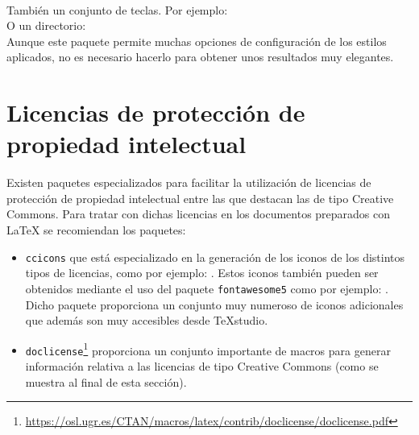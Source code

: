 \documentclass[11pt,a4paper]{article}
\begin{document}
\noindent {}\\

\noindent También un conjunto de teclas. Por ejemplo:
\\

\noindent O un directorio:
\\

\noindent Aunque este paquete permite muchas opciones de configuración de los estilos aplicados, no es necesario hacerlo para obtener unos resultados muy elegantes.



\section{Licencias de protección de propiedad intelectual}
Existen paquetes especializados para facilitar la utilización de licencias de protección de propiedad intelectual entre las que destacan las de tipo Creative Commons. Para tratar con dichas licencias en los documentos preparados con \LaTeX{} se recomiendan los paquetes:
\begin{itemize}
\item \texttt{ccicons} que está especializado en la generación de los iconos de los distintos tipos de licencias, como por ejemplo: \ccbyncsa. Estos iconos también pueden ser obtenidos mediante el uso del paquete \texttt{fontawesome5} como por ejemplo: \faCreativeCommons{} \faCreativeCommonsBy{} \faCreativeCommonsNcEu{} \faCreativeCommonsSa . Dicho paquete proporciona un conjunto muy numeroso de iconos adicionales que además son muy accesibles desde \TeX studio.

\item \texttt{doclicense}\footnote{\url{https://osl.ugr.es/CTAN/macros/latex/contrib/doclicense/doclicense.pdf}} proporciona un conjunto importante de macros para generar información relativa a las licencias de tipo Creative Commons (como se muestra al final de esta sección).
\end{itemize}

\doclicenseThis %
\end{document}

